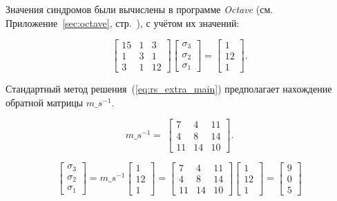 Значения синдромов были вычислены в программе \textit{Octave}
(см. Приложение~\ref{sec:octave}, стр.~\pageref{page4}), с учётом их
значений:

\begin{equation}
  \label{eq:rs_extra_main}
  \begin{bmatrix}
    15 & 1 & 3 \\
    1 & 3 & 1 \\
    3 & 1 & 12
  \end{bmatrix}
  \begin{bmatrix}
    \sigma_3\\
    \sigma_2\\
    \sigma_1
  \end{bmatrix} =
  \begin{bmatrix}
    1\\
    12\\
    1
  \end{bmatrix}.
\end{equation}

Стандартный метод решения~(\ref{eq:rs_extra_main}) предполагает
нахождение обратной матрицы $m\_s^{-1}$.

\begin{equation*}
  m\_s^{-1} = \
  \begin{bmatrix}
    7 & 4 & 11 \\
    4 & 8 & 14 \\
    11 & 14 & 10
  \end{bmatrix}.
\end{equation*}

\begin{equation*}
  \begin{bmatrix}
    \sigma_3\\
    \sigma_2\\
    \sigma_1
  \end{bmatrix} = m\_s^{-1}
  \begin{bmatrix}
    1\\
    12\\
    1
  \end{bmatrix} =
  \begin{bmatrix}
    7 & 4 & 11 \\
    4 & 8 & 14 \\
    11 & 14 & 10
  \end{bmatrix}
  \begin{bmatrix}
    1\\
    12\\
    1
  \end{bmatrix} =
  \begin{bmatrix}
    9\\
    0\\
    5
  \end{bmatrix}
\end{equation*}

